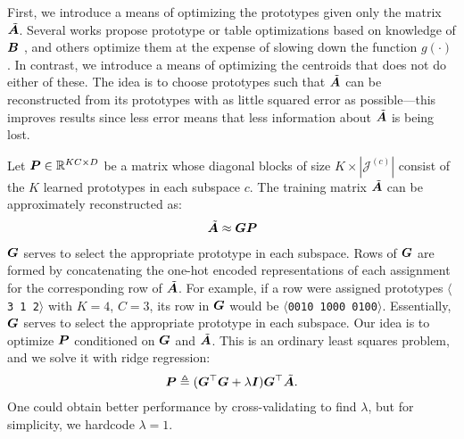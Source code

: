 First, we introduce a means of optimizing the prototypes given only the matrix $\tilde{\bm{A}}$. Several works propose prototype or table optimizations based on knowledge of $\bm{B}$ \cite{pairq,optimizedDists}, and others optimize them at the expense of slowing down the function $g(\cdot)$ \cite{cq,scq}. In contrast, we introduce a means of optimizing the centroids that does not do either of these. The idea is to choose prototypes such that $\tilde{\bm{A}}$ can be reconstructed from its prototypes with as little squared error as possible---this improves results since less error means that less information about $\tilde{\bm{A}}$ is being lost.

Let $\bm{P} \in \mathbb{R}^{KC \times D}$ be a matrix whose diagonal blocks of size $K \times |\mathcal{J}^{(c)}|$ consist of the $K$ learned prototypes in each subspace $c$. The training matrix $\tilde{\bm{A}}$ can be approximately reconstructed as:
\begin{align}
    \tilde{\bm{A}} \approx \bm{G}\bm{P}
\end{align}
$\bm{G}$ serves to select the appropriate prototype in each subspace. Rows of $\bm{G}$ are formed by concatenating the one-hot encoded representations of each assignment for the corresponding row of $\tilde{\bm{A}}$. For example, if a row were assigned prototypes $\langle$\texttt{3 1 2}$\rangle$ with $K = 4$, $C = 3$, its row in $\bm{G}$ would be $\langle$\texttt{0010 1000 0100}$\rangle$. Essentially, $\bm{G}$ serves to select the appropriate prototype in each subspace. Our idea is to optimize $\bm{P}$ conditioned on $\bm{G}$ and $\tilde{\bm{A}}$. This is an ordinary least squares problem, and we solve it with ridge regression:
\begin{align}
    \bm{P} \triangleq (\bm{G}^\top \bm{G} + \lambda \bm{I}) \bm{G}^\top \tilde{\bm{A}}.
\end{align}
One could obtain better performance by cross-validating to find $\lambda$, but for simplicity, we hardcode $\lambda = 1$. %

